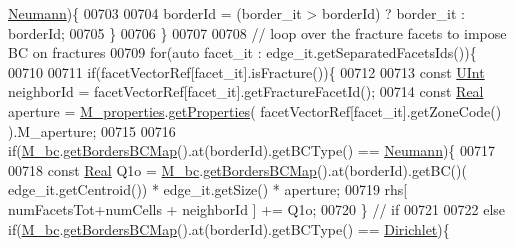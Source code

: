 \begin{DoxyCode}
      \hyperlink{namespaceFVCode3D_a73660061f11f1671164ce171a053f8c5a30212425b27314b01b40f4984dbf850a}{Neumann})\{
00703                                 
00704                 borderId = (border\_it > borderId) ? border\_it : borderId;
00705                         \}
00706         \}
00707 
00708         \textcolor{comment}{// loop over the fracture facets to impose BC on fractures}
00709         \textcolor{keywordflow}{for}(\textcolor{keyword}{auto} facet\_it : edge\_it.getSeparatedFacetsIds())\{
00710                          
00711             \textcolor{keywordflow}{if}(facetVectorRef[facet\_it].isFracture())\{
00712                                 
00713                 \textcolor{keyword}{const} \hyperlink{namespaceFVCode3D_a4bf7e328c75d0fd504050d040ebe9eda}{UInt} neighborId = facetVectorRef[facet\_it].getFractureFacetId();
00714                 \textcolor{keyword}{const} \hyperlink{namespaceFVCode3D_a40c1f5588a248569d80aa5f867080e83}{Real} aperture = \hyperlink{classFVCode3D_1_1MatrixHandler_ad17a7941b1b8272f50fc6e1c660103fa}{M\_properties}.\hyperlink{classFVCode3D_1_1PropertiesMap_ace888d15c9a4ab13d5e217a3a565604c}{getProperties}( 
      facetVectorRef[facet\_it].getZoneCode() ).M\_aperture;
00715 
00716                 \textcolor{keywordflow}{if}(\hyperlink{classFVCode3D_1_1StiffMatrix_a23e3ffc97fcf112958e9966cac41e9d3}{M\_bc}.\hyperlink{classFVCode3D_1_1BoundaryConditions_a5b53a81bdab88709fae14892bfe6a7c9}{getBordersBCMap}().at(borderId).getBCType() == 
      \hyperlink{namespaceFVCode3D_a73660061f11f1671164ce171a053f8c5a30212425b27314b01b40f4984dbf850a}{Neumann})\{
00717                                         
00718                     \textcolor{keyword}{const} \hyperlink{namespaceFVCode3D_a40c1f5588a248569d80aa5f867080e83}{Real} Q1o = \hyperlink{classFVCode3D_1_1StiffMatrix_a23e3ffc97fcf112958e9966cac41e9d3}{M\_bc}.\hyperlink{classFVCode3D_1_1BoundaryConditions_a5b53a81bdab88709fae14892bfe6a7c9}{getBordersBCMap}().at(borderId).getBC()(
      edge\_it.getCentroid()) * edge\_it.getSize() * aperture;
00719                     rhs[ numFacetsTot+numCells + neighborId ] += Q1o;
00720                 \} \textcolor{comment}{// if}
00721                 
00722                 \textcolor{keywordflow}{else} \textcolor{keywordflow}{if}(\hyperlink{classFVCode3D_1_1StiffMatrix_a23e3ffc97fcf112958e9966cac41e9d3}{M\_bc}.\hyperlink{classFVCode3D_1_1BoundaryConditions_a5b53a81bdab88709fae14892bfe6a7c9}{getBordersBCMap}().at(borderId).getBCType() == 
      \hyperlink{namespaceFVCode3D_a73660061f11f1671164ce171a053f8c5a192024697bdaa4fbbb39b8961b747bce}{Dirichlet})\{

\end{DoxyCode}
